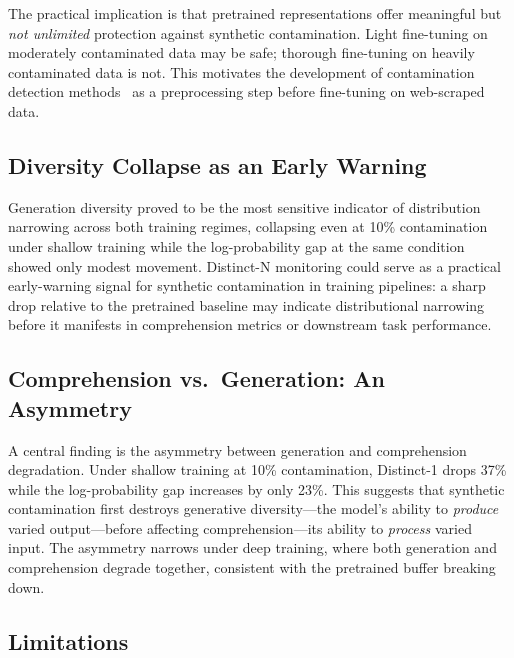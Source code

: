 \documentclass{article}
\begin{document}
The practical implication is that pretrained representations offer meaningful but \emph{not unlimited} protection against synthetic contamination.
Light fine-tuning on moderately contaminated data may be safe; thorough fine-tuning on heavily contaminated data is not.
This motivates the development of contamination detection methods~\citep{shi2024detecting,golchin2024time} as a preprocessing step before fine-tuning on web-scraped data.

\subsection{Diversity Collapse as an Early Warning}

Generation diversity proved to be the most sensitive indicator of distribution narrowing across both training regimes, collapsing even at 10\% contamination under shallow training while the log-probability gap at the same condition showed only modest movement.
Distinct-N monitoring could serve as a practical early-warning signal for synthetic contamination in training pipelines: a sharp drop relative to the pretrained baseline may indicate distributional narrowing before it manifests in comprehension metrics or downstream task performance.

\subsection{Comprehension vs.\ Generation: An Asymmetry}

A central finding is the asymmetry between generation and comprehension degradation.
Under shallow training at 10\% contamination, Distinct-1 drops 37\% while the log-probability gap increases by only 23\%.
This suggests that synthetic contamination first destroys generative diversity---the model's ability to \emph{produce} varied output---before affecting comprehension---its ability to \emph{process} varied input.
The asymmetry narrows under deep training, where both generation and comprehension degrade together, consistent with the pretrained buffer breaking down.

\subsection{Limitations}
\end{document}
